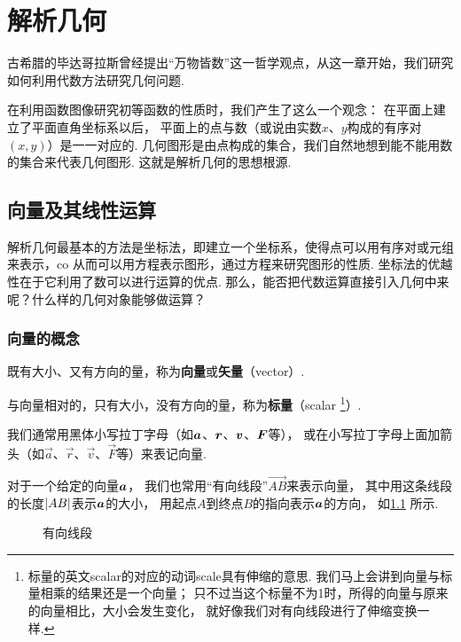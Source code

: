 \chapter{解析几何}
古希腊的毕达哥拉斯曾经提出“万物皆数”这一哲学观点，从这一章开始，我们研究如何利用代数方法研究几何问题.

在利用函数图像研究初等函数的性质时，我们产生了这么一个观念：
在平面上建立了平面直角坐标系以后，%
平面上的点与数（或说由实数\(x\)、\(y\)构成的有序对\((x,y)\)）是一一对应的.
几何图形是由点构成的集合，我们自然地想到能不能用数的集合来代表几何图形.
这就是解析几何的思想根源.


\section{向量及其线性运算}
解析几何最基本的方法是坐标法，即建立一个坐标系，使得点可以用有序对或元组来表示，co
从而可以用方程表示图形，通过方程来研究图形的性质.
坐标法的优越性在于它利用了数可以进行运算的优点.
那么，能否把代数运算直接引入几何中来呢？什么样的几何对象能够做运算？

\subsection{向量的概念}
\begin{definition}
既有大小、又有方向的量，称为\textbf{向量}或\textbf{矢量}（vector）.

与向量相对的，只有大小，没有方向的量，称为\textbf{标量}（scalar
\footnote{标量的英文scalar的对应的动词scale具有伸缩的意思.
我们马上会讲到向量与标量相乘的结果还是一个向量；
只不过当这个标量不为1时，所得的向量与原来的向量相比，大小会发生变化，
就好像我们对有向线段进行了伸缩变换一样.}）.
\end{definition}

我们通常用黑体小写拉丁字母（如\(\boldsymbol{a}\)、\(\boldsymbol{r}\)、\(\boldsymbol{v}\)、\(\boldsymbol{F}\)等），
或在小写拉丁字母上面加箭头（如\(\vec{a}\)、\(\vec{r}\)、\(\vec{v}\)、\(\vec{F}\)等）来表记向量.

对于一个给定的向量\(\boldsymbol{a}\)，
我们也常用“有向线段”\(\vec{AB}\)来表示向量，
其中用这条线段的长度\(\abs{AB}\)表示\(\boldsymbol{a}\)的大小，
用起点\(A\)到终点\(B\)的指向表示\(\boldsymbol{a}\)的方向，
如\cref{figure:解析几何.有向线段} 所示.
\begin{figure}[ht]
\centering
{}
\caption{有向线段}
\label{figure:解析几何.有向线段}
\end{figure}

